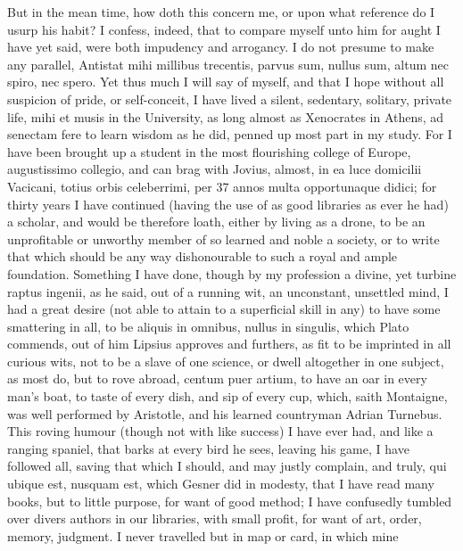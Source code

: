 {But in the mean time, how doth this concern me, or upon what reference
do I usurp his habit? I confess, indeed, that to compare myself unto
him for aught I have yet said, were both impudency and arrogancy. I do
not presume to make any parallel, Antistat mihi millibus trecentis,
parvus sum, nullus sum, altum nec spiro, nec spero. Yet thus much I
will say of myself, and that I hope without all suspicion of pride, or
self-conceit, I have lived a silent, sedentary, solitary, private life,
mihi et musis in the University, as long almost as Xenocrates in
Athens, ad senectam fere to learn wisdom as he did, penned up most part
in my study. For I have been brought up a student in the most
flourishing college of Europe,  augustissimo collegio, and can brag
with Jovius, almost, in ea luce domicilii Vacicani, totius orbis
celeberrimi, per 37 annos multa opportunaque didici; for thirty years I
have continued (having the use of as good libraries as ever he had)
a scholar, and would be therefore loath, either by living as a drone,
to be an unprofitable or unworthy member of so learned and noble a
society, or to write that which should be any way dishonourable to such
a royal and ample foundation. Something I have done, though by my
profession a divine, yet turbine raptus ingenii, as he said, out of
a running wit, an unconstant, unsettled mind, I had a great desire (not
able to attain to a superficial skill in any) to have some smattering
in all, to be aliquis in omnibus, nullus in singulis,  which
Plato commends, out of him Lipsius approves and furthers, as
fit to be imprinted in all curious wits, not to be a slave of one
science, or dwell altogether in one subject, as most do, but to rove
abroad, centum puer artium, to have an oar in every man's boat, to 
taste of every dish, and sip of every cup, which, saith Montaigne,
was well performed by Aristotle, and his learned countryman Adrian
Turnebus. This roving humour (though not with like success) I have ever
had, and like a ranging spaniel, that barks at every bird he sees,
leaving his game, I have followed all, saving that which I should, and
may justly complain, and truly, qui ubique est, nusquam est, which
Gesner did in modesty, that I have read many books, but to little
purpose, for want of good method; I have confusedly tumbled over divers
authors in our libraries, with small profit, for want of art, order,
memory, judgment. I never travelled but in map or card, in which mine
}
